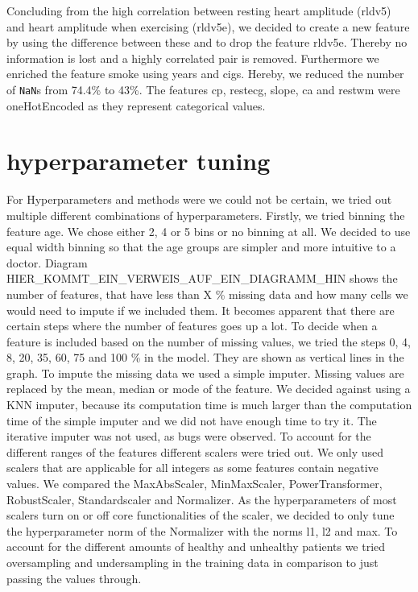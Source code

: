 Concluding from the high correlation between resting heart amplitude (rldv5) and heart amplitude when exercising (rldv5e), we decided to create a new feature by using the difference between these and to drop the feature rldv5e. Thereby no information is lost and a highly correlated pair is removed. Furthermore we enriched the feature smoke using years and cigs. Hereby, we reduced the number of \texttt{NaN}s from 74.4\% to 43\%. The features cp, restecg, slope, ca and restwm were oneHotEncoded as they represent categorical values. 

\section{hyperparameter tuning }
For Hyperparameters and methods were we could not be certain, we tried out multiple different combinations of hyperparameters.
Firstly, we tried binning the feature age. We chose either 2, 4 or 5 bins or no binning at all. We decided to use equal width binning so that the age groups are simpler and more intuitive to a doctor.
Diagram HIER\_KOMMT\_EIN\_VERWEIS\_AUF\_EIN\_DIAGRAMM\_HIN shows the number of features, that have less than X \% missing data and how many cells we would need to impute if we included them. It becomes apparent that there are certain steps where the number of features goes up a lot. To decide when a feature is included based on the number of missing values, we tried the steps 0, 4, 8, 20, 35, 60, 75 and 100 \% in the model. They are shown as vertical lines in the graph.
To impute the missing data we used a simple imputer. Missing values are replaced by the mean, median or mode of the feature. We decided against using a KNN imputer, because its computation time is much larger than the computation time of the simple imputer and we did not have enough time to try it. The iterative imputer was not used, as bugs were observed.
To account for the different ranges of the features different scalers were tried out. We only used scalers that are applicable for all integers as some features contain negative values. 
We compared the MaxAbsScaler, MinMaxScaler, PowerTransformer, RobustScaler, Standardscaler and Normalizer. As the hyperparameters of most scalers turn on or off core functionalities of the scaler, we decided to only tune the hyperparameter norm of the Normalizer with the norms l1, l2 and max.
To account for the different amounts of healthy and unhealthy patients we tried oversampling and undersampling in the training data in comparison to just passing the values through.




